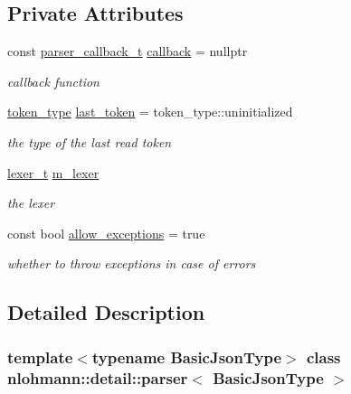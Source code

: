 \subsection*{Private Attributes}
\begin{DoxyCompactItemize}
\item 
const \mbox{\hyperlink{classnlohmann_1_1detail_1_1parser_ad250ad4f2b4af4a497e727c963162ff1}{parser\+\_\+callback\+\_\+t}} \mbox{\hyperlink{classnlohmann_1_1detail_1_1parser_a7600d272ec605e3ffdc8512b3585f476}{callback}} = nullptr
\begin{DoxyCompactList}\small\item\em callback function \end{DoxyCompactList}\item 
\mbox{\hyperlink{classnlohmann_1_1detail_1_1parser_a21d247111b332785b7acf3f8e487d117}{token\+\_\+type}} \mbox{\hyperlink{classnlohmann_1_1detail_1_1parser_a932e49f6f4d291557846744319245994}{last\+\_\+token}} = token\+\_\+type\+::uninitialized
\begin{DoxyCompactList}\small\item\em the type of the last read token \end{DoxyCompactList}\item 
\mbox{\hyperlink{classnlohmann_1_1detail_1_1parser_a16030c5af158a94d1c799f82ff3a0147}{lexer\+\_\+t}} \mbox{\hyperlink{classnlohmann_1_1detail_1_1parser_a22dcc815551a4052b87797b34171b352}{m\+\_\+lexer}}
\begin{DoxyCompactList}\small\item\em the lexer \end{DoxyCompactList}\item 
const bool \mbox{\hyperlink{classnlohmann_1_1detail_1_1parser_a3de1ea054cfa606e79fa07741f081b5f}{allow\+\_\+exceptions}} = true
\begin{DoxyCompactList}\small\item\em whether to throw exceptions in case of errors \end{DoxyCompactList}\end{DoxyCompactItemize}


\subsection{Detailed Description}
\subsubsection*{template$<$typename Basic\+Json\+Type$>$\newline
class nlohmann\+::detail\+::parser$<$ Basic\+Json\+Type $>$}

